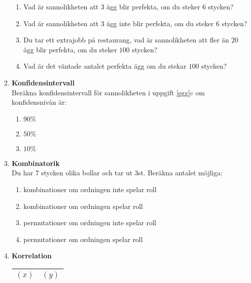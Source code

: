 \documentclass[a4paper,10pt]{article}
\begin{document}
\begin{enumerate}
\begin{enumerate}
        \item{Vad är sannolikheten att $3$ ägg blir perfekta, om du steker $6$ stycken?}
        \vspace{15cm}
        \item{Vad är sannolikheten att $3$ ägg inte blir perfekta, om du steker $6$ stycken?}
        \newpage
        \item{Du tar ett extrajobb på restaurang, vad är sannolikheten att fler än $20$ ägg blir perfekta, om du steker $100$ stycken?}
        \vspace{15cm}
        \item{Vad är det väntade antalet perfekta ägg om du stekar $100$ stycken?}
    \end{enumerate}
    \newpage
    \item{{\bf Konfidensintervall}\\Beräkna konfidensintervall för sannolikheten i uppgift \ref{egg}c om konfidensnivån är:}
    \begin{enumerate}
        \item{$90\%$}
        \vspace{6cm}
        \item{$50\%$}
        \vspace{6cm}
        \item{$10\%$}
    \end{enumerate}
    \newpage
    \item{{\bf Kombinatorik} \\ Du har $7$ stycken olika bollar och tar ut $3$st. Beräkna antalet möjliga:}
    \begin{enumerate}
        \item{kombinationer om ordningen inte spelar roll}
        \vspace{4cm}
        \item{kombinationer om ordningen spelar roll}
        \vspace{4cm}
        \item{permutationer om ordningen inte spelar roll}
        \vspace{4cm}
        \item{permutationer om ordningen spelar roll}
    \end{enumerate}
    \newpage
    \item{{\bf Korrelation} \\
    \begin{table}
        \centering
        \begin{tabular}[H]{c|c}
        \textbf{$(x)$}  & \textbf{$(y)$}\\ \hline

\end{tabular}
\end{table}}
\end{enumerate}
\end{document}
